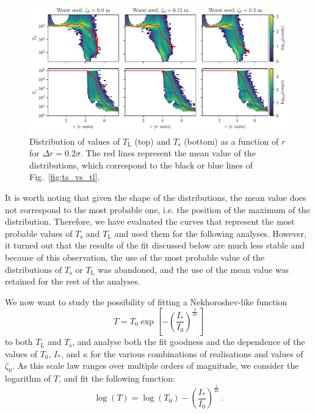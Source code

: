 \begin{figure}
    \centering
    \includegraphics[width=1\textwidth]{6_lhc_dynamic_indicators/figs/updated/dist_and_mean.pdf}
    \caption{Distribution of values of $T_\mathrm{L}$ (top) and $T_\mathrm{s}$ (bottom) as a function of $r$ for $\Delta r = 0.2\sigma$. The red lines represent the mean value of the distributions, which correspond to the black or blue lines of Fig.~\ref{fig:ts_vs_tl}.}
    \label{fig:extra_distribution}
\end{figure}

It is worth noting that given the shape of the distributions, the mean value does not correspond to the most probable one, i.e. the position of the maximum of the distribution. Therefore, we have evaluated the curves that represent the most probable values of $T_\mathrm{s}$ and $T_\mathrm{L}$ and used them for the following analyses. However, it turned out that the results of the fit discussed below are much less stable and because of this observation, the use of the most probable value of the distributions of $T_\mathrm{s}$ or $T_\mathrm{L}$ was abandoned, and the use of the mean value was retained for the rest of the analyses.   

We now want to study the possibility of fitting a Nekhoroshev-like function
\begin{equation}
    T = T_0 \exp\left[-\left(\frac{I_\ast}{I_0}\right)^{\frac{1}{2\kappa}}\right]
\end{equation} 
to both $T_\mathrm{L}$ and $T_\mathrm{s}$, and analyse both the fit goodness and the dependence of the values of $T_0$, $I_\ast$, and $\kappa$ for the various combinations of realisations and values of $\zeta_0$. As this scale law ranges over multiple orders of magnitude, we consider the logarithm of $T$, and fit the following function:
\begin{equation}
    \log(T) = \log(T_0) - \left(\frac{I_\ast}{I_0}\right)^{\frac{1}{2\kappa}} \,.
    \label{eq:log_nek_fit}
\end{equation}

